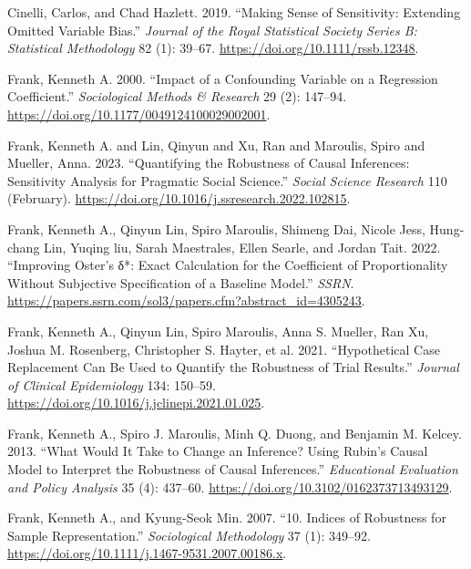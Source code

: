 \documentclass[
]{article}
\newlength{\cslhangindent}
\newlength{\cslentryspacingunit} %
\newenvironment{CSLReferences}[2] %
 {%
  \setlength{\parindent}{0pt}
  \ifodd #1
  \let\oldpar\par
  \def\par{\hangindent=\cslhangindent\oldpar}
  \fi
  \setlength{\parskip}{#2\cslentryspacingunit}
 }%
 {}
\begin{document}
\hypertarget{refs}{}
\begin{CSLReferences}{1}{0}
\leavevmode{}%
Cinelli, Carlos, and Chad Hazlett. 2019. {``{Making Sense of
Sensitivity: Extending Omitted Variable Bias}.''} \emph{Journal of the
Royal Statistical Society Series B: Statistical Methodology} 82 (1):
39--67. \url{https://doi.org/10.1111/rssb.12348}.

\leavevmode{}%
Frank, Kenneth A. 2000. {``Impact of a {Confounding} {Variable} on a
{Regression} {Coefficient}.''} \emph{Sociological Methods \& Research}
29 (2): 147--94. \url{https://doi.org/10.1177/0049124100029002001}.

\leavevmode{}%
Frank, Kenneth A. and Lin, Qinyun and Xu, Ran and Maroulis, Spiro and
Mueller, Anna. 2023. {``Quantifying the Robustness of Causal Inferences:
Sensitivity Analysis for Pragmatic Social Science.''} \emph{Social
Science Research} 110 (February).
\url{https://doi.org/10.1016/j.ssresearch.2022.102815}.

\leavevmode{}%
Frank, Kenneth A., Qinyun Lin, Spiro Maroulis, Shimeng Dai, Nicole Jess,
Hung-chang Lin, Yuqing liu, Sarah Maestrales, Ellen Searle, and Jordan
Tait. 2022. {``Improving Oster's δ*: Exact Calculation for the
Coefficient of Proportionality Without Subjective Specification of a
Baseline Model.''} \emph{SSRN}.
\url{https://papers.ssrn.com/sol3/papers.cfm?abstract_id=4305243}.

\leavevmode{}%
Frank, Kenneth A., Qinyun Lin, Spiro Maroulis, Anna S. Mueller, Ran Xu,
Joshua M. Rosenberg, Christopher S. Hayter, et al. 2021. {``Hypothetical
Case Replacement Can Be Used to Quantify the Robustness of Trial
Results.''} \emph{Journal of Clinical Epidemiology} 134: 150--59.
\url{https://doi.org/10.1016/j.jclinepi.2021.01.025}.

\leavevmode{}%
Frank, Kenneth A., Spiro J. Maroulis, Minh Q. Duong, and Benjamin M.
Kelcey. 2013. {``What {Would} {It} {Take} to {Change} an {Inference}?
{Using} {Rubin}'s {Causal} {Model} to {Interpret} the {Robustness} of
{Causal} {Inferences}.''} \emph{Educational Evaluation and Policy
Analysis} 35 (4): 437--60.
\url{https://doi.org/10.3102/0162373713493129}.

\leavevmode{}%
Frank, Kenneth A., and Kyung-Seok Min. 2007. {``10. Indices of
Robustness for Sample Representation.''} \emph{Sociological Methodology}
37 (1): 349--92. \url{https://doi.org/10.1111/j.1467-9531.2007.00186.x}.


\end{CSLReferences}
\end{document}
